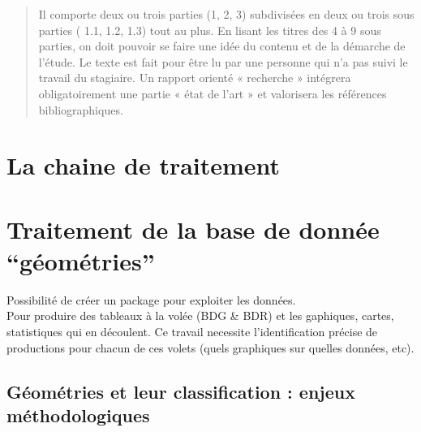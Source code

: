 \documentclass[
  12pt,
  a4paper,
]{scrbook}
\begin{document}
\begin{quote}
Il comporte deux ou trois parties (1, 2, 3) subdivisées en deux ou trois
sous parties ( 1.1, 1.2, 1.3) tout au plus. En lisant les titres des 4 à
9 sous parties, on doit pouvoir se faire une idée du contenu et de la
démarche de l'étude. Le texte est fait pour être lu par une personne qui
n'a pas suivi le travail du stagiaire. Un rapport orienté « recherche »
intégrera obligatoirement une partie « état de l'art » et valorisera les
références bibliographiques.
\end{quote}

\hypertarget{la-chaine-de-traitement}{%
\section{La chaine de traitement}\label{la-chaine-de-traitement}}

\hypertarget{traitement-de-la-base-de-donnuxe9e-guxe9omuxe9tries}{%
\section{Traitement de la base de donnée
``géométries''}\label{traitement-de-la-base-de-donnuxe9e-guxe9omuxe9tries}}

Possibilité de créer un package pour exploiter les données.\\
Pour produire des tableaux à la volée (BDG \& BDR) et les gaphiques,
cartes, statistiques qui en découlent. Ce travail necessite
l'identification précise de productions pour chacun de ces volets (quels
graphiques sur quelles données, etc).

\hypertarget{guxe9omuxe9tries-et-leur-classification-enjeux-muxe9thodologiques}{%
\subsection{Géométries et leur classification : enjeux
méthodologiques}\label{guxe9omuxe9tries-et-leur-classification-enjeux-muxe9thodologiques}}
\end{document}
